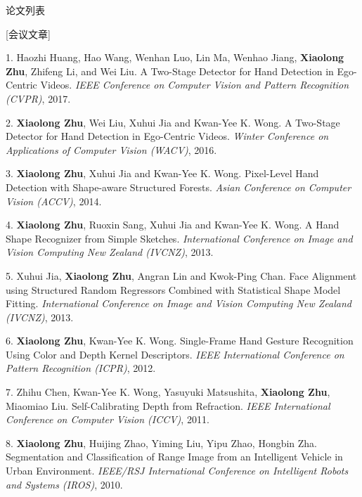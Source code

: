 \documentclass[UTF8]{cv_professional-cn} %
\makeatletter
\newlength{\bibhang}
\newlength{\bibsep}
 {\@listi \global\bibsep\itemsep \global\advance\bibsep by\parsep}
\newenvironment{bibsection}%
        {\vspace{\itemsep}\begin{list}{}{%
       \setlength{\leftmargin}{\bibhang}%
       \setlength{\itemsep}{\bibsep}%
       \setlength{\parsep}{\z@}%
        \setlength{\partopsep}{0pt}%
        \setlength{\topsep}{0pt}}}
        {\end{list}\vspace{\itemsep}}
\makeatother
\begin{document}

\begin{rSection}{论文列表}

[会议文章]

\begin{bibsection}
  \item[1.] Haozhi Huang, Hao Wang, Wenhan Luo, Lin Ma, Wenhao Jiang, \textbf{Xiaolong Zhu}, Zhifeng Li, and Wei Liu. A Two-Stage Detector for Hand Detection in Ego-Centric Videos. \emph{IEEE Conference on Computer Vision and Pattern Recognition (CVPR)}, 2017.

	\item[2.] \textbf{Xiaolong Zhu}, Wei Liu, Xuhui Jia and Kwan-Yee K. Wong. A Two-Stage Detector for Hand Detection in Ego-Centric Videos. \emph{Winter Conference on Applications of Computer Vision (WACV)}, 2016.

	\item[3.] \textbf{Xiaolong Zhu}, Xuhui Jia and Kwan-Yee K. Wong. Pixel-Level Hand Detection with Shape-aware Structured Forests. \emph{Asian Conference on Computer Vision (ACCV)}, 2014.

	\item[4.] \textbf{Xiaolong Zhu}, Ruoxin Sang, Xuhui Jia and Kwan-Yee K. Wong. A Hand Shape Recognizer from Simple Sketches. \emph{International Conference on Image and Vision Computing New Zealand (IVCNZ)}, 2013.

	\item[5.] Xuhui Jia, \textbf{Xiaolong Zhu}, Angran Lin and Kwok-Ping Chan. Face Alignment using Structured Random Regressors Combined with Statistical Shape Model Fitting. \emph{International Conference on Image and Vision Computing New Zealand (IVCNZ)}, 2013.

	\item[6.] \textbf{Xiaolong Zhu}, Kwan-Yee K. Wong. Single-Frame Hand Gesture Recognition Using Color and Depth Kernel Descriptors. \emph{IEEE International Conference on Pattern Recognition (ICPR)}, 2012.

	\item[7.] Zhihu Chen, Kwan-Yee K. Wong, Yasuyuki Matsushita, \textbf{Xiaolong Zhu}, Miaomiao Liu. Self-Calibrating Depth from Refraction. \emph{IEEE International Conference on Computer Vision (ICCV)}, 2011.

	\item[8.] \textbf{Xiaolong Zhu}, Huijing Zhao, Yiming Liu, Yipu Zhao, Hongbin Zha. Segmentation and Classification of Range Image from an Intelligent Vehicle in Urban Environment. \emph{IEEE/RSJ International Conference on Intelligent Robots and Systems (IROS)}, 2010.


\end{bibsection}
\end{rSection}
\end{document}
